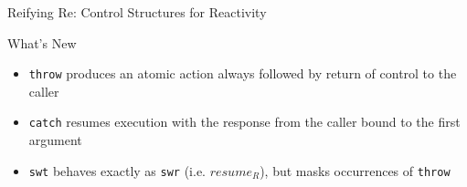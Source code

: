 \documentclass{beamer}
\begin{document}
\begin{frame}{Reifying Re: Control Structures for Reactivity}


\begin{structure}{What's New}
\begin{itemize}

\item{\texttt{throw} produces an atomic action always followed by return of control to the caller}

\item{\texttt{catch} resumes execution with the response from the caller bound to the first argument}

\item{\texttt{swt} behaves exactly as \texttt{swr} (i.e. $resume_R$), but masks occurrences of \texttt{throw}}

\end{itemize}
\end{structure}

\end{frame}
\end{document}
